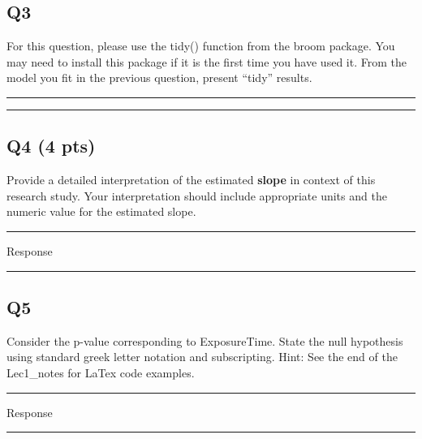 \documentclass[
]{article}
\begin{document}
\hypertarget{q3}{%
\subsection{Q3}\label{q3}}

For this question, please use the tidy() function from the broom
package. You may need to install this package if it is the first time
you have used it. From the model you fit in the previous question,
present ``tidy'' results.

\begin{center}\rule{0.5\linewidth}{0.5pt}\end{center}

\begin{center}\rule{0.5\linewidth}{0.5pt}\end{center}

\hypertarget{q4-4-pts}{%
\subsection{Q4 (4 pts)}\label{q4-4-pts}}

Provide a detailed interpretation of the estimated \textbf{slope} in
context of this research study. Your interpretation should include
appropriate units and the numeric value for the estimated slope.

\begin{center}\rule{0.5\linewidth}{0.5pt}\end{center}

Response

\begin{center}\rule{0.5\linewidth}{0.5pt}\end{center}

\hypertarget{q5}{%
\subsection{Q5}\label{q5}}

Consider the p-value corresponding to ExposureTime. State the null
hypothesis using standard greek letter notation and subscripting. Hint:
See the end of the Lec1\_notes for LaTex code examples.

\begin{center}\rule{0.5\linewidth}{0.5pt}\end{center}

Response

\begin{center}\rule{0.5\linewidth}{0.5pt}\end{center}
\end{document}

